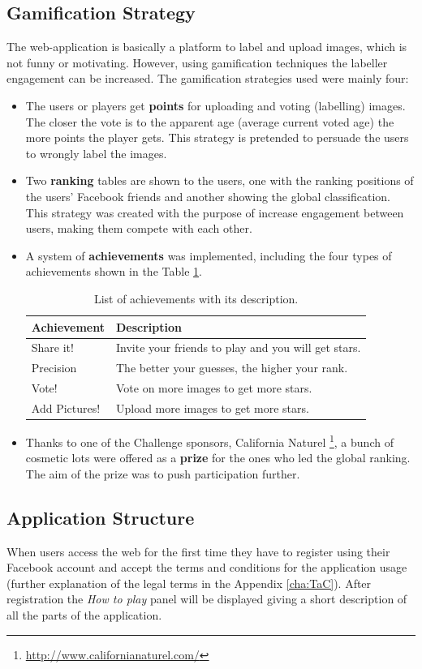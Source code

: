 \subsection{Gamification Strategy}
The web-application is basically a platform to label and upload images, which is not funny or motivating. However, using gamification techniques the labeller engagement can be increased. The gamification strategies used were mainly four:

\begin{itemize}
	\item The users or players get \textbf{points} for uploading and voting (labelling) images. The closer the vote is to the apparent age (average current voted age) the more points the player gets. This strategy is pretended to persuade the users to wrongly label the images.
	\item Two \textbf{ranking} tables are shown to the users, one with the ranking positions of the users' Facebook friends and another showing the global classification. This strategy was created with the purpose of increase engagement between users, making them compete with each other. 
	\item A system of \textbf{achievements} was implemented, including the four types of achievements shown in the Table \ref{tab:achiev}.
	\begin{table}[!h]
		\centering
		\begin{tabular}{l|l}
			\textbf{Achievement} & \textbf{Description} \\\hline\hline
			Share it! &	Invite your friends to play and you will get stars.	\\
			Precision &	The better your guesses, the higher your rank. \\
			Vote! &	Vote on more images to get more stars.\\	
			Add Pictures! &	Upload more images to get more stars. \\
		\end{tabular}
		\caption{List of achievements with its description.}
		\label{tab:achiev}
	\end{table}
	\item Thanks to one of the Challenge sponsors, California Naturel \footnote{\url{http://www.californianaturel.com/}}, a bunch of cosmetic lots were offered as a \textbf{prize} for the ones who led the global ranking. The aim of the prize was to push participation further.
\end{itemize}


\subsection{Application Structure}
When users access the web for the first time they have to register using their Facebook account and accept the terms and conditions for the application usage (further explanation of the legal terms in the Appendix \ref{cha:TaC}). After registration the \textit{How to play} panel will be displayed giving a short description of all the parts of the application.

